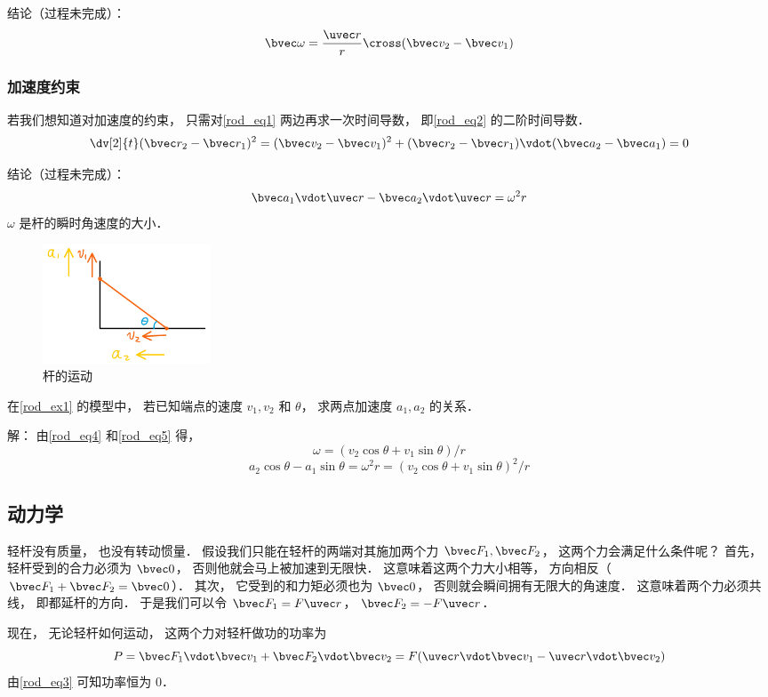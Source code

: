 结论（过程未完成）：
\begin{equation}\label{rod_eq4}
\bvec \omega = \frac{\uvec r}{r} \cross (\bvec v_2 - \bvec v_1)
\end{equation}

\subsubsection{加速度约束}
若我们想知道对加速度的约束， 只需对\autoref{rod_eq1} 两边再求一次时间导数， 即\autoref{rod_eq2} 的二阶时间导数．
\begin{equation}
\dv[2]{t} (\bvec r_2 - \bvec r_1)^2 = (\bvec v_2 - \bvec v_1)^2 + (\bvec r_2 - \bvec r_1) \vdot (\bvec a_2 - \bvec a_1) = 0
\end{equation}

结论（过程未完成）：
\begin{equation}\label{rod_eq5}
\bvec a_1 \vdot \uvec r - \bvec a_2 \vdot \uvec r  = \omega^2 r
\end{equation}
$\omega$ 是杆的瞬时角速度的大小．

\begin{example}{}
\begin{figure}[ht]
\centering
\includegraphics[width=5cm]{./figures/rod2.png}
\caption{杆的运动} \label{rod_fig2}
\end{figure}
在\autoref{rod_ex1} 的模型中， 若已知端点的速度 $v_1, v_2$ 和 $\theta$， 求两点加速度 $a_1, a_2$ 的关系．

解： 由\autoref{rod_eq4} 和\autoref{rod_eq5} 得，
\begin{equation}
\omega = (v_2 \cos\theta + v_1 \sin\theta)/r
\end{equation}
\begin{equation}
a_2 \cos\theta - a_1 \sin\theta = \omega^2 r = (v_2 \cos\theta + v_1 \sin\theta)^2/r
\end{equation}
\end{example}

\subsection{动力学}
轻杆没有质量， 也没有转动惯量． 假设我们只能在轻杆的两端对其施加两个力 $\bvec F_1, \bvec F_2$， 这两个力会满足什么条件呢？ 首先， 轻杆受到的合力必须为 $\bvec 0$， 否则他就会马上被加速到无限快． 这意味着这两个力大小相等， 方向相反（$\bvec F_1 + \bvec F_2 = \bvec 0$）． 其次， 它受到的和力矩必须也为 $\bvec 0$， 否则就会瞬间拥有无限大的角速度． 这意味着两个力必须共线， 即都延杆的方向． 于是我们可以令 $\bvec F_1 = F \uvec r$， $\bvec F_2 = -F \uvec r$．

现在， 无论轻杆如何运动， 这两个力对轻杆做功的功率为
\begin{equation}
P = \bvec F_1 \vdot \bvec v_1 + \bvec F_2 \vdot \bvec v_2 = F (\uvec r \vdot \bvec v_1 - \uvec r \vdot \bvec v_2)
\end{equation}
由\autoref{rod_eq3} 可知功率恒为 0．

